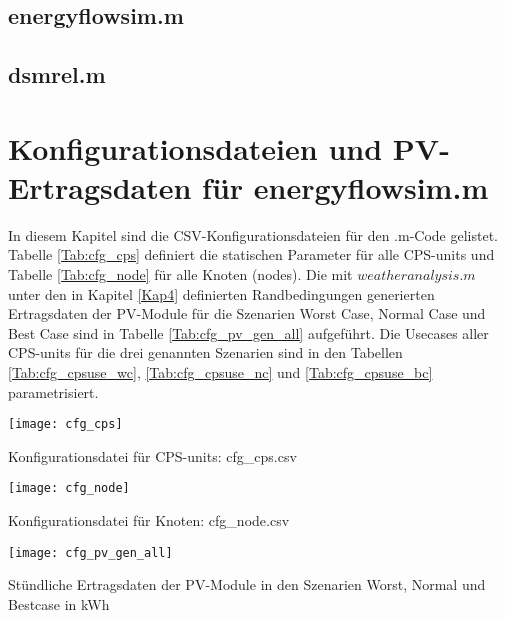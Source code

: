   \subsection{energyflowsim.m}
      
  \subsection{dsmrel.m}
      


\section{Konfigurationsdateien und PV-Ertragsdaten für energyflowsim.m}
\label{Kap:Konfiguration}

In diesem Kapitel sind die CSV-Konfigurationsdateien für den .m-Code gelistet. Tabelle \ref{Tab:cfg_cps} definiert die statischen Parameter für alle CPS-units und Tabelle \ref{Tab:cfg_node} für alle Knoten (nodes). Die mit $weatheranalysis.m$ unter den in Kapitel \ref{Kap4} definierten Randbedingungen generierten Ertragsdaten der PV-Module für die Szenarien Worst Case, Normal Case und Best Case sind in Tabelle \ref{Tab:cfg_pv_gen_all} aufgeführt. Die Usecases aller CPS-units für die drei genannten Szenarien sind in den Tabellen \ref{Tab:cfg_cpsuse_wc}, \ref{Tab:cfg_cpsuse_nc} und \ref{Tab:cfg_cpsuse_bc} parametrisiert.

		\begin{table}[h] 
			\centering
			\texttt{[image: cfg\_cps]}
			\caption{Konfigurationsdatei für CPS-units: cfg\_cps.csv}
			\label{Tab:cfg_cps}
		\end{table} 
        
        \begin{table}[h] 
			\centering
			\texttt{[image: cfg\_node]}
			\caption{Konfigurationsdatei für Knoten: cfg\_node.csv}
			\label{Tab:cfg_node}
		\end{table} 

		\begin{wraptable}[h]{r}{7cm} 
			\centering
			\texttt{[image: cfg\_pv\_gen\_all]}
			\caption{Stündliche Ertragsdaten der PV-Module in den Szenarien Worst, Normal und Bestcase in kWh}
			\label{Tab:cfg_pv_gen_all}
		\end{wraptable} 

